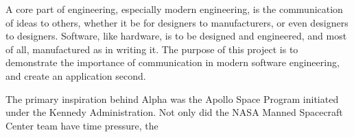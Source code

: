 A core part of engineering, especially modern engineering, is the communication
of ideas to others, whether it be for designers to manufacturers, or even
designers to designers. Software, like hardware, is to be designed and
engineered, and most of all, manufactured as in writing it. The purpose of this
project is to demonstrate the importance of communication in modern software
engineering, and create an application second.

The primary inspiration behind Alpha was the Apollo Space Program initiated
under the Kennedy Administration. Not only did the NASA Manned Spacecraft Center
team have time pressure, the 


